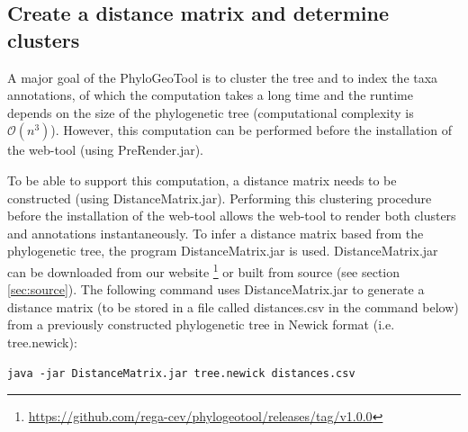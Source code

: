 \documentclass[a4paper, 11pt]{article} %
\begin{document}
\subsection{Create a distance matrix and determine clusters}
A major goal of the PhyloGeoTool is to cluster the tree and to index the taxa annotations, of which the computation takes a long time and the runtime depends on the size of the phylogenetic tree (computational complexity is $\mathcal{O}(n^3)$). 
However, this computation can be performed before the installation of the web-tool (using PreRender.jar).

To be able to support this computation, a distance matrix needs to be constructed (using DistanceMatrix.jar).
Performing this clustering procedure before the installation of the web-tool allows the web-tool to render both clusters and annotations instantaneously.
To infer a distance matrix based from the phylogenetic tree, the program DistanceMatrix.jar is used. DistanceMatrix.jar can be downloaded from our website \footnote{\url{https://github.com/rega-cev/phylogeotool/releases/tag/v1.0.0}} or built from source (see section \ref{sec:source}). 
The following command uses DistanceMatrix.jar to generate a distance matrix (to be stored in a file called distances.csv in the command below) from a previously constructed phylogenetic tree in Newick format (i.e. tree.newick): 
\begin{verbatim}
java -jar DistanceMatrix.jar tree.newick distances.csv
\end{verbatim}
\end{document}
